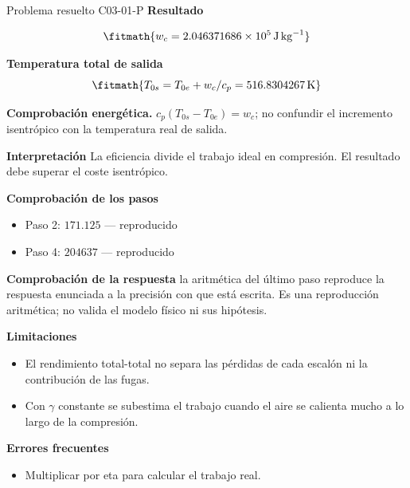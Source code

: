 \documentclass[10pt,openany]{book}
\begin{document}
\begin{studiumworked}{Problema resuelto C03-01-P}
\noindent\textbf{Resultado}

\[
\fitmath{w_c=2.046371686\times10^{5}\,\mathrm{J}\,\mathrm{kg}^{-1}}
\]

\noindent\textbf{Temperatura total de salida}
\[
\fitmath{T_{0s}=T_{0e}+w_c/c_p=516.8304267\,\mathrm{K}}
\]

\noindent\textbf{Comprobación energética.} $c_p(T_{0s}-T_{0e})=w_c$; no confundir el incremento isentrópico con la temperatura real de salida.

\noindent\textbf{Interpretación}
La eficiencia divide el trabajo ideal en compresión. El resultado debe superar el coste isentrópico.

\noindent\textbf{Comprobación de los pasos}
\begin{itemize}
\item Paso 2: $171.125$ — reproducido
\item Paso 4: $204637$ — reproducido
\end{itemize}

\noindent\textbf{Comprobación de la respuesta} la aritmética del último paso reproduce la respuesta enunciada a la precisión con que está escrita. Es una reproducción aritmética; no valida el modelo físico ni sus hipótesis.

\noindent\textbf{Limitaciones}
\begin{itemize}
\item El rendimiento total-total no separa las pérdidas de cada escalón ni la contribución de las fugas.
\item Con $\gamma$ constante se subestima el trabajo cuando el aire se calienta mucho a lo largo de la compresión.
\end{itemize}

\noindent\textbf{Errores frecuentes}
\begin{itemize}
\item Multiplicar por eta para calcular el trabajo real.
\end{itemize}
\end{studiumworked}
\end{document}
